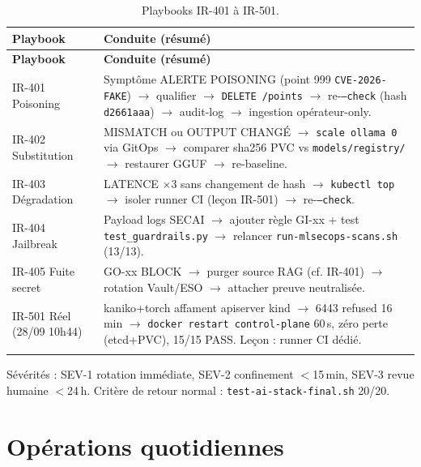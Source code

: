 \documentclass[12pt,a4paper,openany]{report}
\begin{document}
\begin{longtable}{@{}lp{9cm}@{}}
\toprule
\textbf{Playbook} & \textbf{Conduite (résumé)} \\
\midrule
\endfirsthead
\toprule
\textbf{Playbook} & \textbf{Conduite (résumé)} \\
\midrule
\endhead
IR-401 Poisoning &
Symptôme ALERTE POISONING (point 999 \texttt{CVE-2026-FAKE}) $\rightarrow$ qualifier
$\rightarrow$ \texttt{DELETE /points} $\rightarrow$ re-\texttt{--check} (hash \texttt{d2661aaa})
$\rightarrow$ audit-log $\rightarrow$ ingestion opérateur-only. \\
IR-402 Substitution &
MISMATCH ou OUTPUT CHANGÉ $\rightarrow$ \texttt{scale ollama 0} via GitOps
$\rightarrow$ comparer sha256 PVC vs \texttt{models/registry/} $\rightarrow$ restaurer GGUF
$\rightarrow$ re-baseline. \\
IR-403 Dégradation &
LATENCE $\times$3 sans changement de hash $\rightarrow$ \texttt{kubectl top}
$\rightarrow$ isoler runner CI (leçon IR-501) $\rightarrow$ re-\texttt{--check}. \\
IR-404 Jailbreak &
Payload logs SECAI $\rightarrow$ ajouter règle GI-xx + test \texttt{test\_guardrails.py}
$\rightarrow$ relancer \texttt{run-mlsecops-scans.sh} (13/13). \\
IR-405 Fuite secret &
GO-xx BLOCK $\rightarrow$ purger source RAG (cf. IR-401) $\rightarrow$ rotation Vault/ESO
$\rightarrow$ attacher preuve neutralisée. \\
IR-501 Réel (28/09 10h44) &
kaniko+torch affament apiserver kind $\rightarrow$ 6443 refused 16\,min
$\rightarrow$ \texttt{docker restart control-plane} 60\,s, zéro perte (etcd+PVC), 15/15 PASS.
Leçon : runner CI dédié. \\
\bottomrule
\caption{Playbooks IR-401 à IR-501.}
\label{tab:ir}
\end{longtable}

Sévérités : SEV-1 rotation immédiate, SEV-2 confinement $<$15\,min, SEV-3 revue humaine $<$24\,h.
Critère de retour normal : \texttt{test-ai-stack-final.sh} 20/20.

\section{Opérations quotidiennes}
\end{document}

